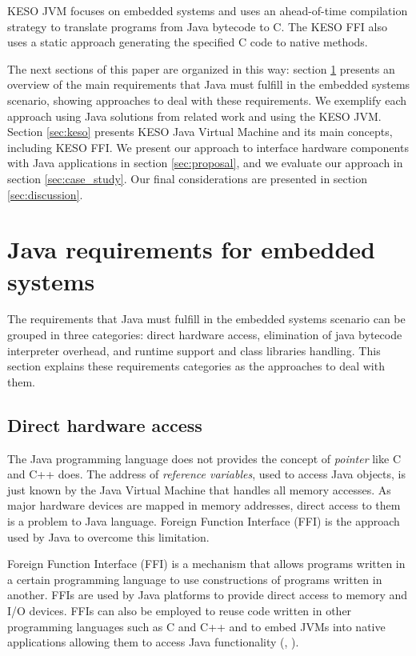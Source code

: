 \documentclass[12pt]{article} %
\begin{document}
KESO JVM focuses on embedded systems and uses an ahead-of-time compilation strategy to translate programs from Java bytecode to C. The KESO FFI also uses a static approach generating the specified C code to native methods.

The next sections of this paper are organized in this way: section \ref{sec:related_work} presents an overview of the main requirements that Java must fulfill in the embedded systems scenario, showing approaches to deal with these requirements. We exemplify each approach using Java solutions from related work and using the KESO JVM. Section \ref{sec:keso} presents KESO Java Virtual Machine and its main concepts, including KESO FFI. We present our approach to interface hardware components with Java applications in section \ref{sec:proposal}, and we evaluate our approach in section \ref{sec:case_study}. Our final considerations are presented in section \ref{sec:discussion}.

\section{Java requirements for embedded systems}
\label{sec:related_work}
	The requirements that Java must fulfill in the embedded systems scenario
can be grouped in three categories: direct hardware access, elimination of 
java bytecode interpreter overhead, and runtime support and class libraries 
handling. This section explains these requirements categories as the
approaches to deal with them. 
\subsection{Direct hardware access}
	The Java programming language does not provides the concept of 
\emph{pointer} like C and C++ does. The address of \emph{reference variables},
used to access Java objects, is just known by the Java Virtual Machine that 
handles all memory accesses. As major hardware devices are mapped in memory 
addresses, direct access to them is a problem to Java language. Foreign 
Function Interface (FFI) is the approach used by Java to overcome this
limitation.

	Foreign Function Interface (FFI) is a mechanism that allows programs 
written in a certain programming language to use constructions of programs 
written in another.
FFIs are used by Java platforms to provide direct access to memory and I/O 
devices. FFIs can also be employed to reuse code written in other programming
languages such as C and C++ and to embed JVMs into native applications allowing
them to access Java functionality (\cite{Liang:1999}, \cite{1288968}).
\end{document}
